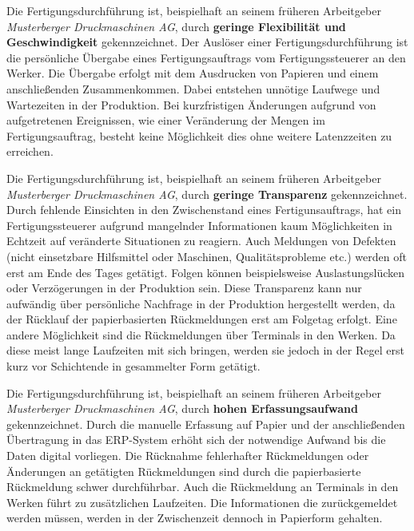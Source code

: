 \begin{definitionForm}[KA-B-1]
Die Fertigungsdurchführung ist, beispielhaft an seinem früheren Arbeitgeber \textit{Musterberger Druckmaschinen AG}, durch \textbf{geringe Flexibilität und Geschwindigkeit} gekennzeichnet. Der Auslöser einer Fertigungsdurchführung ist die persönliche Übergabe eines Fertigungsauftrags vom Fertigungssteuerer an den Werker. Die Übergabe erfolgt mit dem Ausdrucken von Papieren und einem anschließenden Zusammenkommen. Dabei entstehen unnötige Laufwege und Wartezeiten in der Produktion. Bei kurzfristigen Änderungen aufgrund von aufgetretenen Ereignissen, wie einer Veränderung der Mengen im Fertigungsauftrag, besteht keine Möglichkeit dies ohne weitere Latenzzeiten zu erreichen.
\end{definitionForm}

\begin{definitionForm}[KA-B-2]
Die Fertigungsdurchführung ist, beispielhaft an seinem früheren Arbeitgeber \textit{Musterberger Druckmaschinen AG}, durch \textbf{geringe Transparenz} gekennzeichnet. Durch fehlende Einsichten in den Zwischenstand eines Fertigunsauftrags, hat ein Fertigungssteuerer aufgrund mangelnder Informationen kaum Möglichkeiten in Echtzeit auf veränderte Situationen zu reagiern. Auch Meldungen von Defekten (nicht einsetzbare Hilfsmittel oder Maschinen, Qualitätsprobleme etc.) werden oft erst am Ende des Tages getätigt. Folgen können beispielsweise Auslastungslücken oder Verzögerungen in der Produktion sein. Diese Transparenz kann nur aufwändig über persönliche Nachfrage in der Produktion hergestellt werden, da der Rücklauf der papierbasierten Rückmeldungen erst am Folgetag erfolgt. Eine andere Möglichkeit sind die Rückmeldungen über Terminals in den Werken. Da diese meist lange Laufzeiten mit sich bringen, werden sie jedoch in der Regel erst kurz vor Schichtende in gesammelter Form getätigt. 
\end{definitionForm}

\begin{definitionForm}[KA-B-3]
Die Fertigungsdurchführung ist, beispielhaft an seinem früheren Arbeitgeber \textit{Musterberger Druckmaschinen AG}, durch \textbf{hohen Erfassungsaufwand} gekennzeichnet. Durch die manuelle Erfassung auf Papier und der anschließenden Übertragung in das ERP-System erhöht sich der notwendige Aufwand bis die Daten digital vorliegen. Die Rücknahme fehlerhafter Rückmeldungen oder Änderungen an getätigten Rückmeldungen sind durch die papierbasierte Rückmeldung schwer durchführbar. Auch die Rückmeldung an Terminals in den Werken führt zu zusätzlichen Laufzeiten. Die Informationen die zurückgemeldet werden müssen, werden in der Zwischenzeit dennoch in Papierform gehalten. 
\end{definitionForm}

